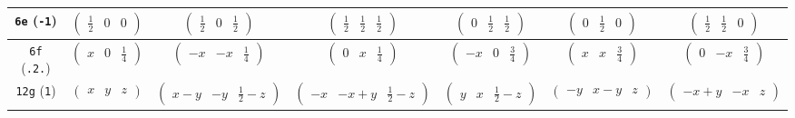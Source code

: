 \documentclass[fleqn,9pt,landscape]{jsarticle}
\begin{document}
\begin{center}
\begin{longtable}{ccccccc}
{\tt 6e} ({\tt -1}) & $ \begin{pmatrix} \frac{1}{2} & 0 & 0 \end{pmatrix} $ & $ \begin{pmatrix} \frac{1}{2} & 0 & \frac{1}{2} \end{pmatrix} $ & $ \begin{pmatrix} \frac{1}{2} & \frac{1}{2} & \frac{1}{2} \end{pmatrix} $ & $ \begin{pmatrix} 0 & \frac{1}{2} & \frac{1}{2} \end{pmatrix} $ & $ \begin{pmatrix} 0 & \frac{1}{2} & 0 \end{pmatrix} $ & $ \begin{pmatrix} \frac{1}{2} & \frac{1}{2} & 0 \end{pmatrix} $ \\ \hline
{\tt 6f} ({\tt .2.}) & $ \begin{pmatrix} x & 0 & \frac{1}{4} \end{pmatrix} $ & $ \begin{pmatrix} - x & - x & \frac{1}{4} \end{pmatrix} $ & $ \begin{pmatrix} 0 & x & \frac{1}{4} \end{pmatrix} $ & $ \begin{pmatrix} - x & 0 & \frac{3}{4} \end{pmatrix} $ & $ \begin{pmatrix} x & x & \frac{3}{4} \end{pmatrix} $ & $ \begin{pmatrix} 0 & - x & \frac{3}{4} \end{pmatrix} $ \\ \hline
{\tt 12g} ({\tt 1}) & $ \begin{pmatrix} x & y & z \end{pmatrix} $ & $ \begin{pmatrix} x - y & - y & \frac{1}{2} - z \end{pmatrix} $ & $ \begin{pmatrix} - x & - x + y & \frac{1}{2} - z \end{pmatrix} $ & $ \begin{pmatrix} y & x & \frac{1}{2} - z \end{pmatrix} $ & $ \begin{pmatrix} - y & x - y & z \end{pmatrix} $ & $ \begin{pmatrix} - x + y & - x & z \end{pmatrix} $ \\

\end{longtable}
\end{center}
\end{document}
